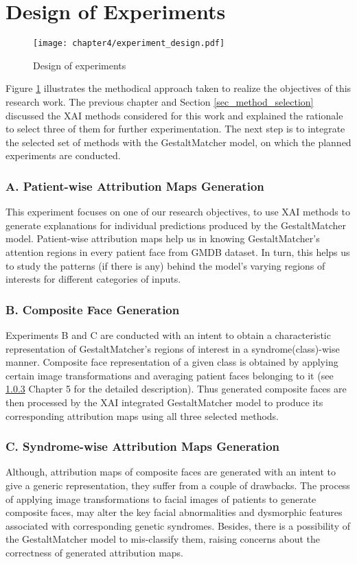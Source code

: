 \documentclass[../report.tex]{subfiles}
\begin{document}
    \section{Design of Experiments}\label{sec_exp_design}
    \begin{figure}[ht]
    	\hspace*{-0.5cm}      
       	\texttt{[image: chapter4/experiment\_design.pdf]}
        	\caption{Design of experiments}
    	    	\label{fig_exp_design}
    \end{figure}
    Figure \ref{fig_exp_design} illustrates the methodical approach taken to realize the objectives of this research work. The previous chapter and Section \ref{sec_method_selection} discussed the XAI methods considered for this work and explained the rationale to select three of them for further experimentation. The next step is to integrate the selected set of methods with the GestaltMatcher model, on which the planned experiments are conducted. 

    \subsubsection{A. Patient-wise Attribution Maps Generation}
    This experiment focuses on one of our research objectives, to use XAI methods to generate explanations for individual predictions produced by the GestaltMatcher model. 
    Patient-wise attribution maps help us in knowing GestaltMatcher's attention regions in every patient face from GMDB dataset. In turn, this helps us to study the patterns (if there is any) behind the model's varying regions of interests for different categories of inputs.
    \subsubsection{B. Composite Face Generation}
    Experiments B and C are conducted with an intent to obtain a characteristic representation of GestaltMatcher's regions of interest in a syndrome(class)-wise manner. Composite face representation of a given class is obtained by applying certain image transformations and averaging patient faces belonging to it (see \ref{} Chapter 5 for the detailed description). Thus generated composite faces are then processed by the XAI integrated GestaltMatcher model to produce its corresponding attribution maps using all three selected methods.
    \subsubsection{C. Syndrome-wise Attribution Maps Generation}
    Although, attribution maps of composite faces are generated with an intent to give a generic representation, they suffer from a couple of drawbacks. The process of applying image transformations to facial images of patients to generate composite faces, may alter the key facial abnormalities and dysmorphic features associated with corresponding genetic syndromes. Besides, there is a possibility of the GestaltMatcher model to mis-classify them, raising concerns about the correctness of generated attribution maps. 
    
\end{document}
